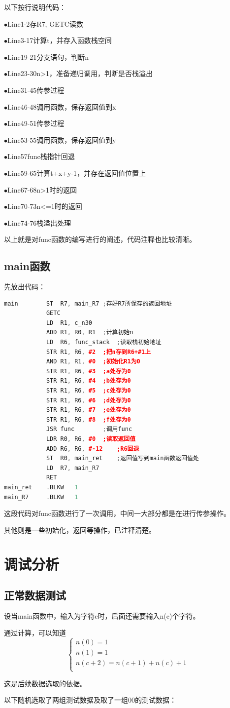 \documentclass[UTF8]{article}
\newcommand{\keytitle}[2]{$\bullet$#1\quad#2\par}
\begin{document}
以下按行说明代码：\par
\keytitle{Line1-2}{存R7, GETC读数}
\keytitle{Line3-17}{计算t，并存入函数栈空间}
\keytitle{Line19-21}{分支语句，判断n}
\keytitle{Line23-30}{n>1，准备递归调用，判断是否栈溢出}
\keytitle{Line31-45}{传参过程}
\keytitle{Line46-48}{调用函数，保存返回值到x}
\keytitle{Line49-51}{传参过程}
\keytitle{Line53-55}{调用函数，保存返回值到y}
\keytitle{Line57}{func栈指针回退}
\keytitle{Line59-65}{计算t+x+y-1，并存在返回值位置上}
\keytitle{Line67-68}{n>1时的返回}
\keytitle{Line70-73}{n<=1时的返回}
\keytitle{Line74-76}{栈溢出处理}
以上就是对func函数的编写进行的阐述，代码注释也比较清晰。\par
\subsection{main函数}
先放出代码：\par
\begin{lstlisting}[language=C++]
main		ST	R7, main_R7	;存好R7所保存的返回地址
			GETC
			LD	R1, c_n30
			ADD	R1, R0, R1	;计算初始n
			LD	R6, func_stack	;读取栈初始地址
			STR	R1, R6, #2	;把n存到R6+#1上
			AND	R1, R1, #0	;初始化R1为0
			STR	R1, R6, #3	;a处存为0
			STR	R1, R6, #4	;b处存为0
			STR	R1, R6, #5	;c处存为0
			STR	R1, R6, #6	;d处存为0
			STR	R1, R6, #7	;e处存为0
			STR	R1, R6, #8	;f处存为0
			JSR	func		;调用func
			LDR	R0, R6, #0	;读取返回值
			ADD	R6, R6, #-12	;R6回退
			ST	R0, main_ret	;返回值写到main函数返回值处
			LD	R7, main_R7
			RET
main_ret	.BLKW	1
main_R7		.BLKW	1
\end{lstlisting}\par
这段代码对func函数进行了一次调用，中间一大部分都是在进行传参操作。\par
其他则是一些初始化，返回等操作，已注释清楚。\par



\section{调试分析}
\subsection{正常数据测试}
设当main函数中，输入为字符c时，后面还需要输入n(c)个字符。\par
通过计算，可以知道
$$
\left\{
\begin{array}{l}
n(0)=1\\
n(1)=1\\
n(c+2)=n(c+1)+n(c)+1\\
\end{array}
\right. 
$$\par
这是后续数据选取的依据。\par
以下随机选取了两组测试数据及取了一组00的测试数据：\par
\end{document}
